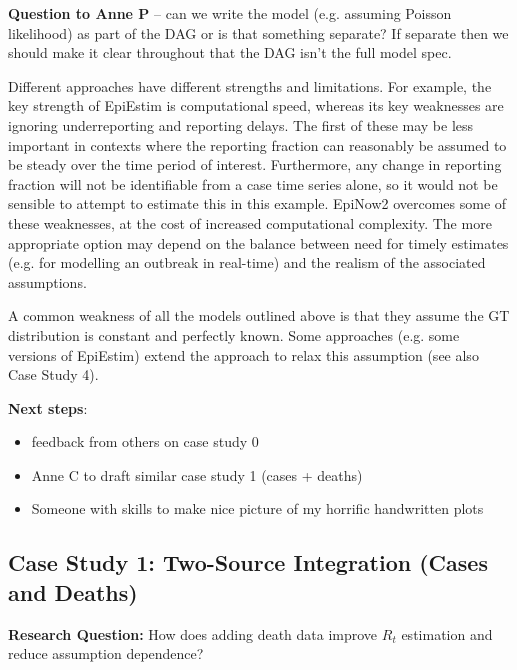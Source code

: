 \documentclass{article}
\begin{document}
\textbf{Question to Anne P} – can we write the model (e.g. assuming Poisson likelihood) as part of the DAG or is that something separate? If separate then we should make it clear throughout that the DAG isn’t the full model spec.

Different approaches have different strengths and limitations. For example, the key strength of EpiEstim is computational speed, whereas its key weaknesses are ignoring underreporting and reporting delays. The first of these may be less important in contexts where the reporting fraction can reasonably be assumed to be steady over the time period of interest. Furthermore, any change in reporting fraction will not be identifiable from a case time series alone, so it would not be sensible to attempt to estimate this in this example. EpiNow2 overcomes some of these weaknesses, at the cost of increased computational complexity. The more appropriate option may depend on the balance between need for timely estimates (e.g. for modelling an outbreak in real-time) and the realism of the associated assumptions. 

A common weakness of all the models outlined above is that they assume the GT distribution is constant and perfectly known. Some approaches (e.g. some versions of EpiEstim) extend the approach to relax this assumption (see also Case Study 4).
 
\textbf{Next steps}:
\begin{itemize}
    \item feedback from others on case study 0
    \item Anne C to draft similar case study 1 (cases + deaths)
    \item Someone with skills to make nice picture of my horrific handwritten plots
\end{itemize}

\subsection{Case Study 1: Two-Source Integration (Cases and Deaths)}

\textbf{Research Question:} How does adding death data improve $R_t$ estimation and reduce assumption dependence?
\end{document}
